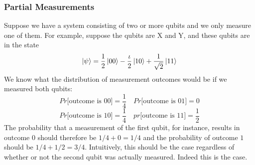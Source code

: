 \subsubsection{Partial Measurements}
Suppose we have a system consisting of two or more qubits and we only measure one of them. For
example, suppose the qubits are X and Y, and these qubits are in the state
\[
\ket{\psi}=\frac{1}{2}\ket{00}-\frac{\iota}{2}\ket{10}+\frac{1}{\sqrt{2}}\ket{11}
\]
We know what the distribution of measurement outcomes would be if we measured both qubits:
\[
Pr\text{[outcome is 00]} = \frac{1}{4} \quad Pr\text{[outcome is 01]}=0
\]
\[
Pr\text{[outcome is 10]}=\frac{1}{4} \quad pr\text{[outcome is 11]}=\frac{1}{2}
\]
The probability that a measurement of the first qubit, for instance, results in outcome $0$ should
therefore be $1/4+0 = 1/4$ and the probability of outcome $1$ should be $1/4+1/2 = 3/4$. Intuitively,
this should be the case regardless of whether or not the second qubit was actually measured. Indeed
this is the case.

